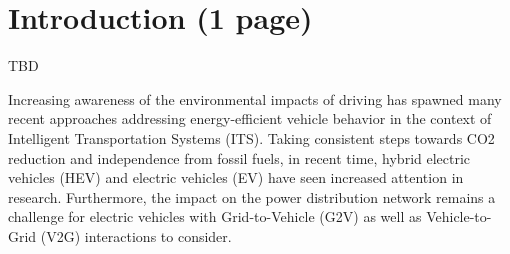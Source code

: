 \section{Introduction (1 page)}

TBD~

Increasing awareness of the environmental impacts of driving has spawned many recent approaches addressing energy-efficient vehicle behavior in the context of Intelligent Transportation Systems (ITS). Taking consistent steps towards CO2 reduction and independence from fossil fuels, in recent time, hybrid electric vehicles (HEV) and electric vehicles (EV) have seen increased attention in research. 
Furthermore, the impact on the power distribution network remains a challenge for electric vehicles with Grid-to-Vehicle (G2V) as well as Vehicle-to-Grid (V2G) interactions to consider.
